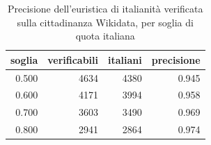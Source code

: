 \begin{table}
\centering
\caption{Precisione dell'euristica di italianità verificata sulla cittadinanza Wikidata, per soglia di quota italiana}
\label{tab:t1_validazione_italianita}
\begin{tabular}{rrrr}
\toprule
 soglia &  verificabili &  italiani &  precisione \\
\midrule
  0.500 &          4634 &      4380 &       0.945 \\
  0.600 &          4171 &      3994 &       0.958 \\
  0.700 &          3603 &      3490 &       0.969 \\
  0.800 &          2941 &      2864 &       0.974 \\
\bottomrule
\end{tabular}
\end{table}
